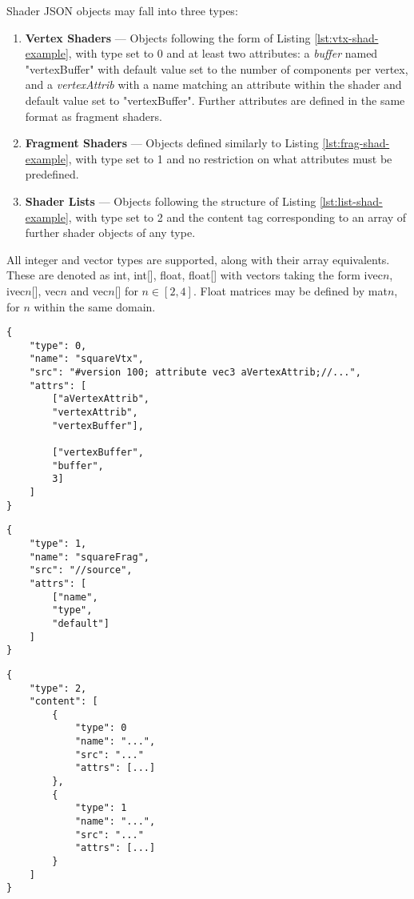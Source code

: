 \documentclass{l3proj}
\begin{document}
Shader JSON objects may fall into three types:
\begin{enumerate}
\item \textbf{Vertex Shaders} --- Objects following the form of Listing \ref{lst:vtx-shad-example}, with type set to 0 and at least two attributes: a \textit{buffer} named "vertexBuffer" with default value set to the number of components per vertex, and a \textit{vertexAttrib} with a name matching an attribute within the shader and default value set to "vertexBuffer". Further attributes are defined in the same format as fragment shaders.
\item \textbf{Fragment Shaders} --- Objects defined similarly to Listing \ref{lst:frag-shad-example}, with type set to 1 and no restriction on what attributes must be predefined.
\item \textbf{Shader Lists} --- Objects following the structure of Listing \ref{lst:list-shad-example}, with type set to 2 and the content tag corresponding to an array of further shader objects of any type.
\end{enumerate}
All integer and vector types are supported, along with their array equivalents. These are denoted as int, int[], float, float[] with vectors taking the form ivec$n$, ivec$n$[], vec$n$ and vec$n$[] for $ n \in [2,4] $. Float matrices may be defined by mat$n$, for $n$ within the same domain.
\begin{center}
\lstset{%
      basicstyle=\ttfamily\footnotesize\bfseries,
      frame=single,
      xleftmargin=.1\textwidth, xrightmargin=.1\textwidth,
      captionpos=b,
      tabsize=4
    }
\begin{lstlisting}[caption={Vertex Shader JSON Structure},label={lst:vtx-shad-example}]
{
	"type": 0,
	"name": "squareVtx",
	"src": "#version 100; attribute vec3 aVertexAttrib;//...",
	"attrs": [
		["aVertexAttrib",
		"vertexAttrib",
		"vertexBuffer"],
		
		["vertexBuffer",
		"buffer",
		3]
	]
}
\end{lstlisting}
\clearpage
\begin{lstlisting}[caption={Fragment Shader JSON Structure},label={lst:frag-shad-example}]
{
	"type": 1,
	"name": "squareFrag",
	"src": "//source",
	"attrs": [
		["name",
		"type",
		"default"]
	]
}
\end{lstlisting}
\begin{lstlisting}[caption={Shader List JSON Structure},label={lst:list-shad-example}]
{
	"type": 2,
	"content": [
		{
			"type": 0
			"name": "...",
			"src": "..."
			"attrs": [...]
		},
		{
			"type": 1
			"name": "...",
			"src": "..."
			"attrs": [...]
		}
	]
}
\end{lstlisting}
\end{center}
\end{document}
